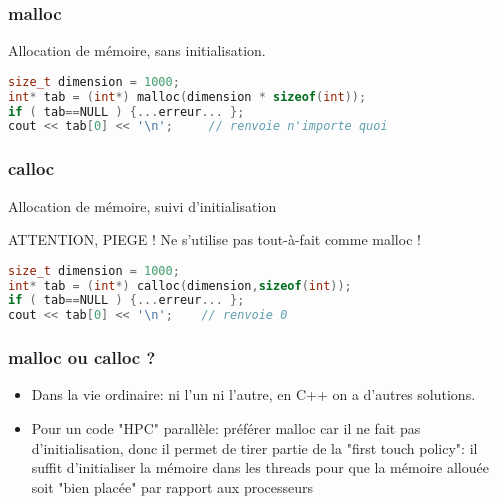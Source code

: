 \documentclass{beamer}
\begin{document}
\begin{frame}[fragile=singleslide,shrink=20]
\frametitle{malloc}
Allocation de mémoire, sans initialisation.

\begin{lstlisting}[language=c++]
size_t dimension = 1000;
int* tab = (int*) malloc(dimension * sizeof(int));
if ( tab==NULL ) {...erreur... };
cout << tab[0] << '\n';     // renvoie n'importe quoi
\end{lstlisting}
\end{frame}

\begin{frame}[fragile=singleslide,shrink=20]
\frametitle{calloc}
Allocation de mémoire, suivi d'initialisation

\begin{block}{ATTENTION, PIEGE !}
Ne s'utilise pas tout-à-fait comme malloc !
\begin{lstlisting}[language=c++]
size_t dimension = 1000;
int* tab = (int*) calloc(dimension,sizeof(int));
if ( tab==NULL ) {...erreur... };
cout << tab[0] << '\n';    // renvoie 0
\end{lstlisting}
\end{block}
\end{frame}

\begin{frame}[fragile=singleslide,shrink=20]
\frametitle{malloc ou calloc ?}

\begin{itemize}
\item{Dans la vie ordinaire: ni l'un ni l'autre, en C++ on a d'autres solutions}.
\item{Pour un code "HPC" parallèle: préférer malloc car il ne fait pas d'initialisation,
donc il permet de tirer partie de la "first touch policy": il suffit d'initialiser la mémoire
dans les threads pour que la mémoire allouée soit "bien placée" par rapport aux processeurs}
\end{itemize}

\end{frame}
\end{document}
